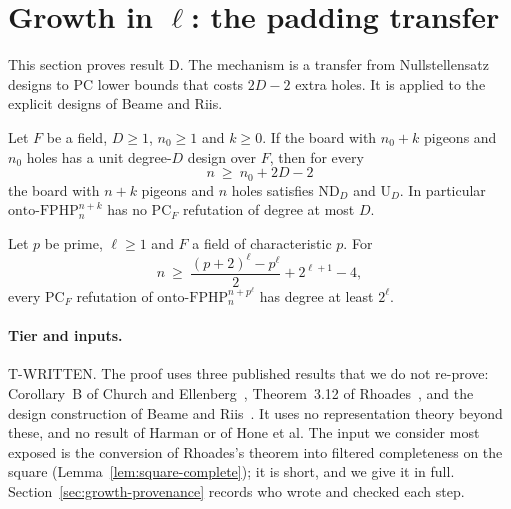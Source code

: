 
\section{Growth in \texorpdfstring{$\ell$}{l}: the padding transfer}\label{sec:growth}

This section proves result D.  The mechanism is a transfer from Nullstellensatz designs to
PC lower bounds that costs $2D-2$ extra holes.  It is applied to the explicit designs of
Beame and Riis.

\begin{theorem}\label{thm:padding}
Let $F$ be a field, $D\ge1$, $n_0\ge1$ and $k\ge0$.  If the board with $n_0+k$ pigeons and
$n_0$ holes has a unit degree-$D$ design over $F$, then for every
\[
  n\ \ge\ n_0+2D-2
\]
the board with $n+k$ pigeons and $n$ holes satisfies $\mathrm{ND}_D$ and $\mathrm{U}_D$.  In
particular $\mathrm{onto\text{-}FPHP}^{n+k}_n$ has no $\mathrm{PC}_F$ refutation of degree at
most $D$.
\end{theorem}

\begin{corollary}[D]\label{cor:growth}
Let $p$ be prime, $\ell\ge1$ and $F$ a field of characteristic $p$.  For
\[
  n\ \ge\ \frac{(p+2)^\ell-p^\ell}{2}+2^{\ell+1}-4,
\]
every $\mathrm{PC}_F$ refutation of $\mathrm{onto\text{-}FPHP}^{n+p^\ell}_n$ has degree at
least $2^\ell$.
\end{corollary}

\paragraph{Tier and inputs.}  T-WRITTEN.  The proof uses three published results that we do
not re-prove: Corollary~B of Church and Ellenberg~\cite{churchellenberg}, Theorem~3.12 of
Rhoades~\cite{rhoades2024}, and the design construction of Beame and
Riis~\cite[Def.~8.2, Lemma~8.4, proof of Thm.~8.1]{beame1998counting}.  It uses no
representation theory beyond these, and no result of Harman or of Hone et al.  The input we
consider most exposed is the conversion of Rhoades's theorem into filtered completeness on
the square (Lemma~\ref{lem:square-complete}); it is short, and we give it in full.
Section~\ref{sec:growth-provenance} records who wrote and checked each step.


